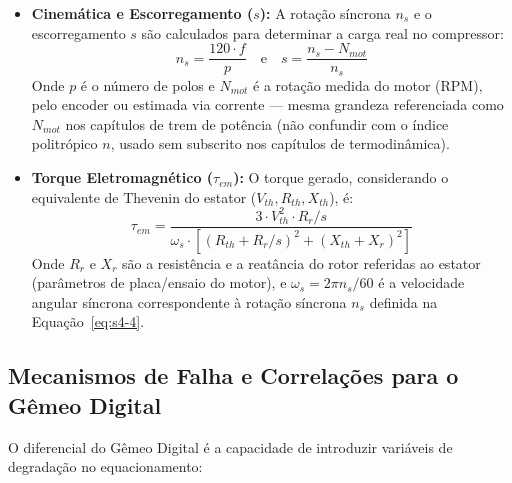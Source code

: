 \documentclass[12pt,a4paper]{article}
\numberwithin{equation}{section}
\numberwithin{table}{section}
\numberwithin{figure}{section}
\begin{document}
	\begin{itemize}
		\item \textbf{Cinemática e Escorregamento ($s$):}
		A rotação síncrona $n_s$ e o escorregamento $s$ são calculados para determinar a carga real no compressor:
		\begin{equation}\label{eq:s4-4}
 n_s = \frac{120 \cdot f}{p} \quad \text{e} \quad s = \frac{n_s - N_{mot}}{n_s} 
\end{equation}
		Onde $p$ é o número de polos e $N_{mot}$ é a rotação medida do motor (RPM), pelo encoder ou estimada via corrente — mesma grandeza referenciada como $N_{mot}$ nos capítulos de trem de potência (não confundir com o índice politrópico $n$, usado sem subscrito nos capítulos de termodinâmica).
		\item \textbf{Torque Eletromagnético ($\tau_{em}$):}
		O torque gerado, considerando o equivalente de Thevenin do estator ($V_{th}, R_{th}, X_{th}$), é:
		\begin{equation}\label{eq:s4-5}
 \tau_{em} = \frac{3 \cdot V_{th}^2 \cdot R_r / s}{\omega_s \cdot \left[ (R_{th} + R_r / s)^2 + (X_{th} + X_r)^2 \right]} 
\end{equation}
		Onde $R_r$ e $X_r$ são a resistência e a reatância do rotor referidas ao estator (parâmetros de placa/ensaio do motor), e $\omega_s = 2\pi n_s/60$ é a velocidade angular síncrona correspondente à rotação síncrona $n_s$ definida na Equação~\eqref{eq:s4-4}.
	\end{itemize}
	
	\subsection{\textbf{Mecanismos de Falha e Correlações para o Gêmeo Digital}}
	O diferencial do Gêmeo Digital é a capacidade de introduzir variáveis de degradação no equacionamento:
	
\end{document}

